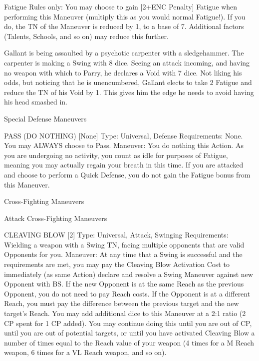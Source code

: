 \documentclass[oneside,11pt,english]{book}
\begin{document}
Fatigue Rules only: You may choose to gain [2+ENC Penalty] Fatigue when performing this Maneuver 
(multiply this as you would normal Fatigue!). If you do, the TN of the Maneuver is reduced by 1, to a 
base of 7. Additional factors (Talents, Schools, and so on) may reduce this further. 

 
Gallant is being assaulted by a psychotic carpenter with a sledgehammer. The carpenter is making a Swing with 8 dice. Seeing 
an attack incoming, and having no weapon with which to Parry, he declares a Void with 7 dice. Not liking his odds, but noticing 
that he is unencumbered, Gallant elects to take 2 Fatigue and reduce the TN of his Void by 1. This gives him the edge he needs to 
avoid having his head smashed in. 
 

 

Special Defense Maneuvers 

 

PASS (DO NOTHING) [None] 
Type: Universal, Defense 
Requirements: None. You may ALWAYS choose to Pass. 
Maneuver: You do nothing this Action. As you are undergoing no activity, you count as idle for purposes 
of Fatigue, meaning you may actually regain your breath in this time. 
If you are attacked and choose to perform a Quick Defense, you do not gain the Fatigue bonus from this 
Maneuver. 

 

 

Cross-Fighting Maneuvers 

 

Attack Cross-Fighting Maneuvers 

 

CLEAVING BLOW [2] 
Type: Universal, Attack, Swinging 
Requirements: Wielding a weapon with a Swing TN, facing multiple opponents that are valid Opponents 
for you. 
Maneuver: At any time that a Swing is successful and the requirements are met, you may pay the 
Cleaving Blow Activation Cost to immediately (as same Action) declare and resolve a Swing Maneuver 
against new Opponent with BS. If the new Opponent is at the same Reach as the previous Opponent, you 
do not need to pay Reach costs. If the Opponent is at a different Reach, you must pay the difference 
between the previous target and the new target’s Reach. 
You may add additional dice to this Maneuver at a 2:1 ratio (2 CP spent for 1 CP added). You may 
continue doing this until you are out of CP, until you are out of potential targets, or until you have 
activated Cleaving Blow a number of times equal to the Reach value of your weapon (4 times for a M 
Reach weapon, 6 times for a VL Reach weapon, and so on). 
\end{document}
